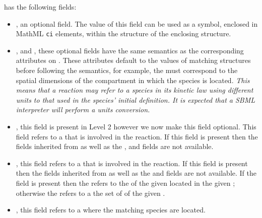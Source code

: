\documentclass{cekarticle}
\begin{document}
 has the following fields:

\begin{itemize}

\item {}, an optional  field. The value of
this field can be used as a symbol, enclosed in MathML \texttt{ci}
elements, within the  structure of the enclosing
 structure.

\item {},  and
, these optional fields have the
same semantics as the corresponding attributes on .
These attributes default to the values of matching 
structures before following the  semantics, for
example, the  must correspond to the
spatial dimensions of the compartment in which the species is
located.  \emph{This means that a reaction may refer to a species
in its kinetic law using different units to that used in the
species' initial definition.  It is expected that a SBML
interpreter will perform a units conversion.}

\item {}, this  field is present in Level 2 however we now make this field
optional.  This field refers to a  that is involved in the reaction.  If this field is
present then the fields inherited from  as well as the ,
 and  fields are not available.

\item {}, this  field refers to a
 that is involved in the reaction.  If this
field is present then the fields inherited from
 as well as the  and
 fields are not available.  If the
 field is present then the
 refers to the  of
the given  located in the given
; otherwise the 
refers to a the set of  of the given
.

\item {}, this  field refers to a
 where the matching species are located.

\end{itemize}
\end{document}
